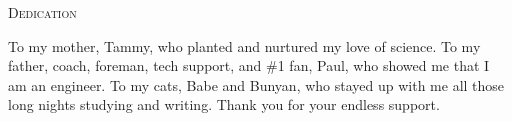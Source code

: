 \vspace*{\fill}
\begin{center}
{\LARGE\textsc{Dedication}}\vspace{0.5cm}

To my mother, Tammy, who planted and nurtured my love of science. To my father, coach, foreman, tech support, and \#1 fan, Paul, who showed me that I am an engineer. To my cats, Babe and Bunyan, who stayed up with me all those long nights studying and writing. Thank you for your endless support.

\end{center}
\vspace{\fill}
